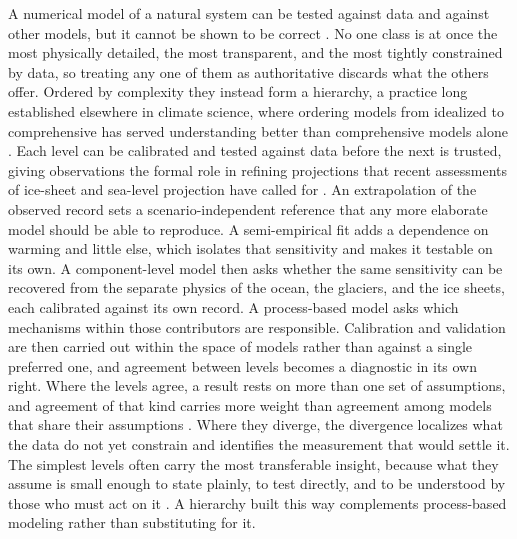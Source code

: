 \documentclass[12pt]{article}
\begin{document}
A numerical model of a natural system can be tested against data and against other
models, but it cannot be shown to be correct \citep{Oreskes1994}. No one class is at once
the most physically detailed, the most transparent, and the most tightly constrained by
data, so treating any one of them as authoritative discards what the others offer.
Ordered by complexity they instead form a hierarchy, a practice long established
elsewhere in climate science, where ordering models from idealized to comprehensive
has served understanding better than comprehensive models alone
\citep{Held2005,Jeevanjee2017,Maher2019}. Each level can be calibrated and tested against data before the next is
trusted, giving observations the formal role in refining projections that recent
assessments of ice-sheet and sea-level projection have called for
\citep{Aschwanden2021,Felikson2025}. An extrapolation of
the observed record sets a scenario-independent reference that any more elaborate model
should be able to reproduce. A semi-empirical fit adds a dependence on warming and little
else, which isolates that sensitivity and makes it testable on its own. A
component-level model then asks whether the same sensitivity can be recovered from the
separate physics of the ocean, the glaciers, and the ice sheets, each calibrated against
its own record. A process-based model asks which mechanisms within those contributors are
responsible. Calibration and validation are then carried out within the space of models
rather than against a single preferred one, and agreement between levels becomes a
diagnostic in its own right. Where the levels agree, a result rests on more than one set
of assumptions, and agreement of that kind carries more weight than agreement among
models that share their assumptions \citep{Lipscomb2025}. Where they diverge, the
divergence localizes what the data do not yet
constrain and identifies the measurement that would settle it. The simplest levels often
carry the most transferable insight, because what they assume is small enough to state
plainly, to test directly, and to be understood by those who must act on it
\citep{Green2015,Makridakis2020}. A hierarchy built this way complements process-based
modeling rather than substituting for it.
\end{document}
